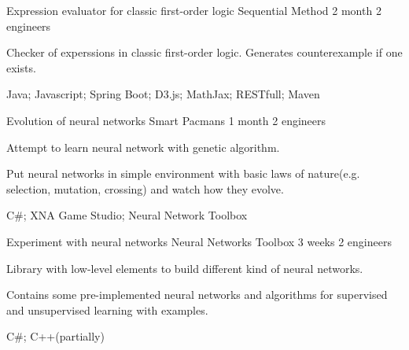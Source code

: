 \begin{cventries}
  \cventry
    {Expression evaluator for classic first-order logic}
    {Sequential Method}
    {2 month}
    {2 engineers}
    {
      \begin{cvitems}
        \item {Checker of experssions in classic first-order logic. Generates counterexample if one exists.}
        \item {Java; Javascript; Spring Boot; D3.js; MathJax; RESTfull; Maven}
      \end{cvitems}
    }
  \cventry
    {Evolution of neural networks}
    {Smart Pacmans}
    {1 month}
    {2 engineers}
    {
      \begin{cvitems}
        \item {Attempt to learn neural network with genetic algorithm.}
        \item {Put neural networks in simple environment with basic laws of nature(e.g. selection, mutation, crossing) and watch how they evolve.}
        \item {C\#; XNA Game Studio; Neural Network Toolbox}
      \end{cvitems} 
    }
  \cventry
    {Experiment with neural networks}
    {Neural Networks Toolbox}
    {3 weeks}
    {2 engineers}
    {
      \begin{cvitems}
        \item {Library with low-level elements to build different kind of neural networks.}
        \item {Contains some pre-implemented neural networks and algorithms for supervised and unsupervised learning with examples.}
        \item {C\#; C++(partially)}
      \end{cvitems}
    }
\end{cventries}
